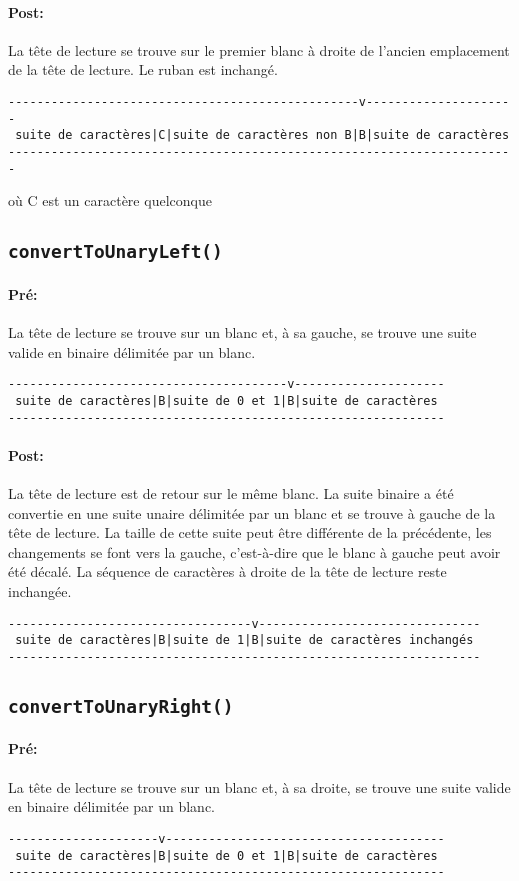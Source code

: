 \documentclass[a4paper,11pt]{article}
\begin{document}
\paragraph{Post:} La tête de lecture se trouve sur le premier blanc à droite de l'ancien emplacement de la tête de lecture. Le ruban est inchangé.
\begin{verbatim}
-------------------------------------------------v---------------------
 suite de caractères|C|suite de caractères non B|B|suite de caractères
-----------------------------------------------------------------------
\end{verbatim}
où C est un caractère quelconque
\subsection{\texttt{convertToUnaryLeft()}}
\paragraph{Pré:} La tête de lecture se trouve sur un blanc et, à sa gauche, se trouve une suite valide en binaire délimitée par un blanc.
\begin{verbatim}
---------------------------------------v---------------------
 suite de caractères|B|suite de 0 et 1|B|suite de caractères
-------------------------------------------------------------
\end{verbatim}
\paragraph{Post:} La tête de lecture est de retour sur le même blanc. La suite binaire a été convertie en une suite unaire délimitée par un blanc et se trouve à gauche de la tête de lecture.
La taille de cette suite peut être différente de la précédente, les changements se font vers la gauche, c'est-à-dire que le blanc à gauche peut avoir été décalé. La séquence de caractères à droite de la tête de lecture reste inchangée.
\begin{verbatim}
----------------------------------v-------------------------------
 suite de caractères|B|suite de 1|B|suite de caractères inchangés
------------------------------------------------------------------
\end{verbatim}
\subsection{\texttt{convertToUnaryRight()}}
\paragraph{Pré:}
La tête de lecture se trouve sur un blanc et, à sa droite, se trouve une suite valide en binaire délimitée par un blanc.
\begin{verbatim}
---------------------v---------------------------------------
 suite de caractères|B|suite de 0 et 1|B|suite de caractères
-------------------------------------------------------------
\end{verbatim}
\end{document}
